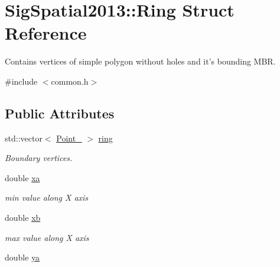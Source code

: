 \hypertarget{structSigSpatial2013_1_1Ring}{\section{Sig\-Spatial2013\-:\-:Ring Struct Reference}
\label{structSigSpatial2013_1_1Ring}
}


Contains vertices of simple polygon without holes and it's bounding M\-B\-R.  




{\ttfamily \#include $<$common.\-h$>$}

\subsection*{Public Attributes}
\begin{DoxyCompactItemize}
\item 
\hypertarget{structSigSpatial2013_1_1Ring_a10e38ba5e6a6d2a1f6a2b1ac1d942e31}{std\-::vector$<$ \hyperlink{namespaceSigSpatial2013_a4d50a6d98aab2aa905654c8c2e3e3c58}{Point\-\_} $>$ \hyperlink{structSigSpatial2013_1_1Ring_a10e38ba5e6a6d2a1f6a2b1ac1d942e31}{ring}}\label{structSigSpatial2013_1_1Ring_a10e38ba5e6a6d2a1f6a2b1ac1d942e31}

\begin{DoxyCompactList}\small\item\em Boundary vertices. \end{DoxyCompactList}\item 
\hypertarget{structSigSpatial2013_1_1Ring_aa6a8cc573c74df27505e2782e9056b9e}{double \hyperlink{structSigSpatial2013_1_1Ring_aa6a8cc573c74df27505e2782e9056b9e}{xa}}\label{structSigSpatial2013_1_1Ring_aa6a8cc573c74df27505e2782e9056b9e}

\begin{DoxyCompactList}\small\item\em min value along X axis \end{DoxyCompactList}\item 
\hypertarget{structSigSpatial2013_1_1Ring_a55f499353ed248f49a6de987dcb790f2}{double \hyperlink{structSigSpatial2013_1_1Ring_a55f499353ed248f49a6de987dcb790f2}{xb}}\label{structSigSpatial2013_1_1Ring_a55f499353ed248f49a6de987dcb790f2}

\begin{DoxyCompactList}\small\item\em max value along X axis \end{DoxyCompactList}\item 
\hypertarget{structSigSpatial2013_1_1Ring_a9de85ffa601a418c01df7f7c1359dce0}{double \hyperlink{structSigSpatial2013_1_1Ring_a9de85ffa601a418c01df7f7c1359dce0}{ya}}\label{structSigSpatial2013_1_1Ring_a9de85ffa601a418c01df7f7c1359dce0}


\end{DoxyCompactItemize}
